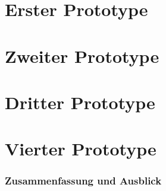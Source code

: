 \documentclass[a4paper,11pt]{article}
\begin{document}



\newpage
\renewcommand{\contentsname}{Inhaltsverzeichnis}
\tableofcontents
\clearpage


\pagestyle{fancy} \fancyhf{} \rhead{\leftmark} \cfoot{\thepage}





\newpage
\fancyhf{} \cfoot{\thepage}  %
\part{Erster Prototype}



\newpage
\fancyhf{} \cfoot{\thepage}  %
\part{Zweiter Prototype}



\newpage
\fancyhf{} \cfoot{\thepage}  %
\part{Dritter Prototype}



\newpage
\fancyhf{} \cfoot{\thepage}  %
\part{Vierter Prototype}



\newpage
\pagestyle{fancy} \fancyhf{} \rhead{\leftmark} \cfoot{\thepage} %
\section{Zusammenfassung und Ausblick} \label{ende-sec}

\end{document}
